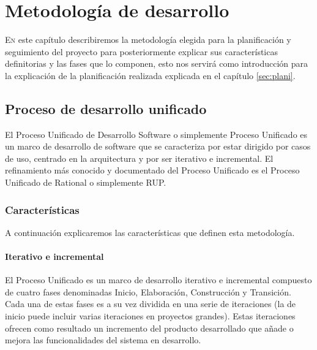 \chapter{Metodología de desarrollo}

\lettrine{E}{n} este capítulo describiremos la metodología elegida para la planificación y seguimiento del proyecto para posteriormente explicar sus características definitorias y las fases que lo componen, esto nos servirá como introducción para la explicación de la planificación realizada explicada en el capítulo \ref{sec:plani}.

\section{Proceso de desarrollo unificado}

El Proceso Unificado de Desarrollo Software o simplemente Proceso Unificado es un marco de desarrollo de software que se caracteriza por estar dirigido por casos de uso, centrado en la arquitectura y por ser iterativo e incremental. El refinamiento más conocido y documentado del Proceso Unificado es el Proceso Unificado de Rational o simplemente RUP.

\subsection{Características}

A continuación explicaremos las características que definen esta metodología.

\subsubsection{Iterativo e incremental}

El Proceso Unificado es un marco de desarrollo iterativo e incremental compuesto de cuatro fases denominadas Inicio, Elaboración, Construcción y Transición. Cada una de estas fases es a su vez dividida en una serie de iteraciones (la de inicio puede incluir varias iteraciones en proyectos grandes). Estas iteraciones ofrecen como resultado un incremento del producto desarrollado que añade o mejora las funcionalidades del sistema en desarrollo.

